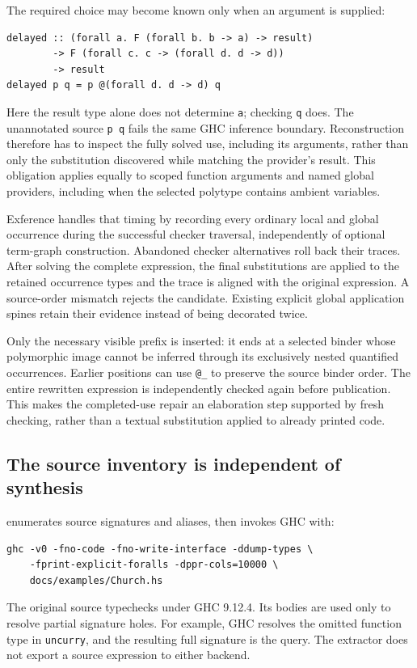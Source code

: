 \documentclass[11pt]{article}
\newcommand{\code}[1]{\texttt{#1}}
\begin{document}
The required choice may become known only when an argument is supplied:
\begin{lstlisting}
delayed :: (forall a. F (forall b. b -> a) -> result)
        -> F (forall c. c -> (forall d. d -> d))
        -> result
delayed p q = p @(forall d. d -> d) q
\end{lstlisting}
Here the result type alone does not determine \code{a}; checking \code{q}
does. The unannotated source \code{p q} fails the same GHC inference boundary.
Reconstruction therefore has to inspect the fully solved use, including its
arguments, rather than only the substitution discovered while matching the
provider's result. This obligation applies equally to scoped function
arguments and named global providers, including when the selected polytype
contains ambient variables.

Exference handles that timing by recording every ordinary local and global
occurrence during the successful checker traversal, independently of optional
term-graph construction. Abandoned checker alternatives roll back their
traces. After solving the complete expression, the final substitutions are
applied to the retained occurrence types and the trace is aligned with the
original expression. A source-order mismatch rejects the candidate. Existing
explicit global application spines retain their evidence instead of being
decorated twice.

Only the necessary visible prefix is inserted: it ends at a selected binder
whose polymorphic image cannot be inferred through its exclusively nested
quantified occurrences. Earlier positions can use \code{@\_} to preserve the
source binder order. The entire rewritten expression is independently checked
again before publication. This makes the completed-use repair an elaboration
step supported by fresh checking, rather than a textual substitution applied
to already printed code.

\subsection{The source inventory is independent of synthesis}

 enumerates source signatures and aliases,
then invokes GHC with:
\begin{lstlisting}
ghc -v0 -fno-code -fno-write-interface -ddump-types \
    -fprint-explicit-foralls -dppr-cols=10000 \
    docs/examples/Church.hs
\end{lstlisting}
The original source typechecks under GHC 9.12.4. Its bodies are used only to
resolve partial signature holes. For example, GHC resolves the omitted
function type in \code{uncurry}, and the resulting full signature is the
query. The extractor does not export a source expression to either backend.
\end{document}
